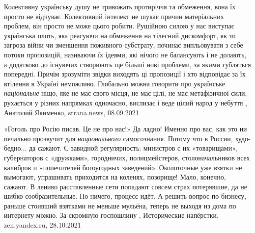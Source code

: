 Колективну українську душу не тривожать протиріччя та обмеження, вона їх просто
не відчуває. Колективний інтелект не шукає причин матеріальних проблем, він
просто не може цього робити. Рушійною силою у нас виступає українська плоть,
яка реагуючи на обмеження на тілесний дискомфорт, як то загроза війни чи
зменшення поживного субстрату, починає випльовувати з себе потоки пропозицій,
називаючи їх ідеями, які нічого не балансують і не долають, а додатково до
існуючих створюють ще більші нові проблеми, за якими губляться попередні.
Причім зрозуміти звідки виходять ці пропозиції і хто відповідає за їх втілення
в Україні неможливо.  Глобально можна говорити про українське \emph{національне} ніщо,
яке не має свого місця, не має цілі, не має метафізичної сили, рухається у
різних напрямках одночасно, вислизає і веде цілий народ у небуття
, Анатолий Якименко, strana.news, 08.09.2021


«Гоголь про Росію писав. Це не про нас!» Да ладно! Именно про вас, как это ни печально прозвучит для
\emph{национального} самосознания. Потому что в России, худо-бедно... да сажают. С
завидной регулярность: министров с их «товарищами», губернаторов с «дружками»,
городничих, полицмейстеров, столоначальников всех калибров и «попечителей
богоугодных заведений». Околоточные уже взятки не вымогают, упрашивать
приходится на коленях, позорище!  Мало, конечно, сажают. В лениво расставленные
сети попадают совсем страх потерявшие, да не шибко сообразительные. Но ничего,
процесс идёт. А решить вопрос по бизнесу, раньше стоивший взятками не меньше
мульёна, теперь не выходя из дома по интернету можно. За скромную госпошлину
, 
Исторические напёрстки, zen.yandex.ru, 28.10.2021
